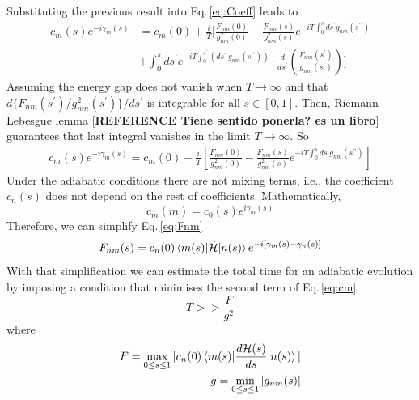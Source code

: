  Substituting the previous result into Eq.\,\eqref{eq:Coeff} leads to
 \begin{equation}
 \begin{split}
      c_{m}(s)e^{-i\gamma_{m}(s)} & = c_{m}(0) + \frac{i}{T}\Biggr[\frac{F_{nm}(0)}{g^{2}_{nm}(0)} - \frac{F_{nm}(s)}{g^{2}_{nm}(s)}e^{-iT\int_{0}^{s}ds^{\prime}g_{nm}(s^{\prime \prime})} \\
      & + \int_{0}^{s}ds^{\prime} e^{-iT\int_{0}^{s^{\prime}}\left(ds^{\prime \prime}g_{nm}(s^{\prime\prime}) \right)} \cdot \frac{d}{ds^{\prime}}\left(\frac{F_{nm}(s^{\prime})}{g_{nm}(s^{\prime})}\right)\Biggr]
\end{split}
\end{equation}
 Assuming the energy gap does not vanish when $T \rightarrow \infty$ and that $d\{F_{nm}(s^{\prime})/g_{nm}^{2}(s^{\prime})\}/ds^{\prime}$ is integrable for all $s \in [0,1]$. Then, Riemann-Lebesgue lemma [\textbf{REFERENCE Tiene sentido ponerla? es un libro}] guarantees that last integral vanishes in the limit $T \rightarrow \infty$. So
  \begin{align}
  \label{eq:cm}
     c_{m}(s)e^{-i\gamma_{m}(s)} = c_{m}(0) + \frac{i}{T}\left[\frac{F_{nm}(0)}{g^{2}_{nm}(0)} - \frac{F_{nm}(s)}{g^{2}_{nm}(s)}e^{-iT\int_{0}^{s}ds^{\prime}g_{nm}(s^{\prime \prime})}\right] 
 \end{align}
 Under the adiabatic conditions there are not mixing terms, i.e., the coefficient $c_{n}(s)$ does not depend on the rest of coefficients. Mathematically,
\begin{equation}
    c_{m}(m) = c_{0}(s)e^{i\gamma_{m}(s)}
\end{equation}
Therefore, we can simplify Eq.\,\eqref{eq:Fnm}
\begin{equation}
    F_{nm}(s) = c_{n}(0)\braket{m(s)|\dot{\mathcal{H}}|n(s)} e^{-i\left[\gamma_{m}(s) - \gamma_{n}(s)\right]}
\end{equation}
 With that simplification we can estimate the total time for an adiabatic evolution by imposing a condition that minimises the second term of Eq.\,\eqref{eq:cm}
 \begin{equation}
     T >> \frac{F}{g^{2}}
 \end{equation}
 where
 \begin{align}
     F = \max_{0 \leq s \leq 1} |c_{n}(0)\braket{m(s)|\frac{d\mathcal{H}(s)}{ds}| n(s)}| \\
     g = \min_{0 \leq s \leq 1} |g_{nm}(s)|
 \end{align}
